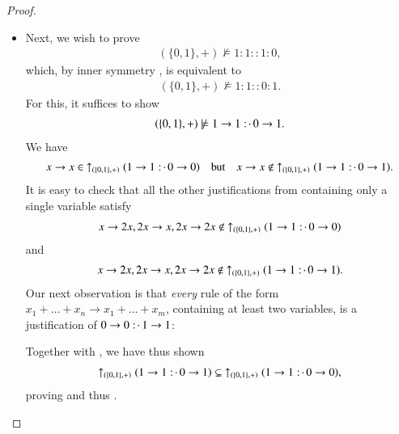 \documentclass[11pt]{amsart}
\theoremstyle{definition} %
\newcommand{\righttherefore}{:\joinrel\cdot\,}
\begin{document}
\begin{proof}
\begin{itemize}
\item Next, we wish to prove
\begin{align}\label{equ:y_+_not_models_1110} 
	(\{0,1\},+)\not\models 1:1::1:0,
\end{align} which, by inner symmetry , is equivalent to
\begin{align*} 
	(\{0,1\},+)\not\models 1:1::0:1.
\end{align*} For this, it suffices to show
\begin{align}\label{equ:y_+_not_models_1101}
	(\{0,1\},+)\not\models 1\to 1 \righttherefore 0\to 1.
\end{align} We have
\begin{align}\label{equ:x_to_x_not_in_uparrow_y_+_1100} 
	x\to x\in\ \uparrow_{(\{0,1\},+)}(1\to 1 \righttherefore 0\to 0) \quad\text{but}\quad x\to x\not\in\ \uparrow_{(\{0,1\},+)}(1\to 1 \righttherefore 0\to 1).
\end{align} It is easy to check that all the other justifications from  containing only a single variable satisfy
\begin{align*} 
	x\to 2x,2x\to x,2x\to 2x\not\in\ \uparrow_{(\{0,1\},+)}(1\to 1 \righttherefore 0\to 0)
\end{align*} and
\begin{align*} 
	x\to 2x,2x\to x,2x\to 2x\not\in\ \uparrow_{(\{0,1\},+)}(1\to 1 \righttherefore 0\to 1).
\end{align*} Our next observation is that \textit{every} rule of the form $x_1+\ldots+x_n\to x_1+\ldots+x_m$, containing at least two variables, is a justification of $0\to 0 \righttherefore 1\to 1$:
\begin{center}
\end{center} Together with , we have thus shown
\begin{align*} 
	\uparrow_{(\{0,1\},+)}(1\to 1 \righttherefore 0\to 1)\subsetneq\ \uparrow_{(\{0,1\},+)}(1\to 1 \righttherefore 0\to 0),
\end{align*} proving  and thus .


\end{itemize}
\end{proof}
\end{document}
